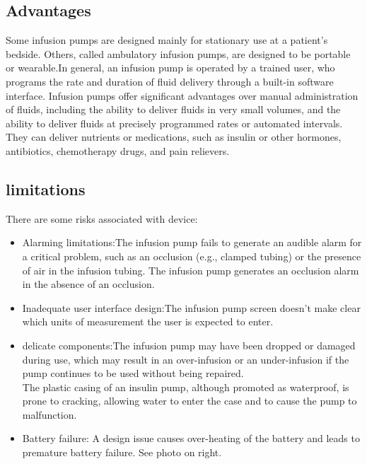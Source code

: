 \documentclass[12pt]{article}
\begin{document}
\subsection{Advantages}

Some infusion pumps are designed mainly for stationary use at a patient’s bedside. Others, called ambulatory infusion pumps, are designed to be portable or wearable.In general, an infusion pump is operated by a trained user, who programs the rate and duration of fluid delivery through a built-in software interface. Infusion pumps offer significant advantages over manual administration of fluids, including the ability to deliver fluids in very small volumes, and the ability to deliver fluids at precisely programmed rates or automated intervals.   They can deliver nutrients or medications, such as insulin or other hormones, antibiotics, chemotherapy drugs, and pain relievers. 
\subsection{limitations}
There are some risks associated with device:\\
\begin{itemize}
\item Alarming limitations:The infusion pump fails to generate an audible alarm for a critical problem, such as an occlusion (e.g., clamped tubing) or the presence of air in the infusion tubing.
The infusion pump generates an occlusion alarm in the absence of an occlusion.\\
\item Inadequate user interface design:The infusion pump screen doesn’t make clear which units of measurement the user is expected to enter.\\
\item delicate components:The infusion pump may have been dropped or damaged during use, which may result in an over-infusion or an under-infusion if the pump continues to be used without being repaired.\\
The plastic casing of an insulin pump, although promoted as waterproof, is prone to cracking, allowing water to enter the case and to cause the pump to malfunction. \\
\item Battery failure: A design issue causes over-heating of the battery and leads to premature battery failure. See photo on right.
\end{itemize}
\end{document}
